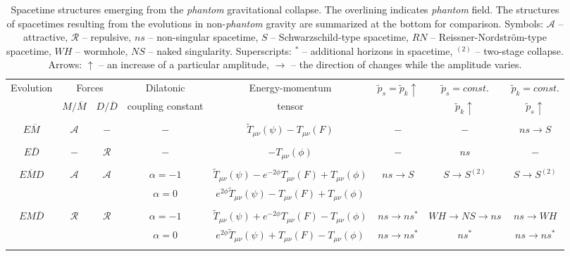 \documentclass[aps,showpacs,nofootinbib,floatfix]{revtex4}
\newcommand{\tpe}{{\tilde p}}
\newcommand{\tT}{\tilde T}
\begin{document}
\begin{table}[t]
\caption{Spacetime structures emerging from the {\it phantom} gravitational collapse. The overlining 
indicates {\it phantom} field. The structures of spacetimes resulting from the evolutions in non-{\it phantom} gravity are summarized at the bottom for comparison. Symbols: $\mathcal{A}$ -- attractive, $\mathcal{R}$ -- repulsive, $ns$ -- non-singular spacetime, $S$ -- Schwarzschild-type spacetime, $RN$ -- Reissner-Nordstr\"{o}m-type spacetime, $WH$ -- wormhole, $NS$ -- naked singularity. Superscripts: $^\ast$ -- additional horizons in spacetime, $^{\left(2\right)}$ -- two-stage collapse. Arrows: $\uparrow$ -- an increase of a particular amplitude, $\rightarrow$ -- the direction of changes while the amplitude varies.}
\begin{ruledtabular}
\begin{tabular}{c|c|c|c|c|c|c|c}
\multirow{2}{*}{Evolution} & \multicolumn{2}{c|}{Forces} & Dilatonic & Energy-momentum & \multirow{2}{*}{$\tpe_s = \tpe_k\uparrow$} & $\tpe_s=const.$ & $\tpe_k=const.$\\ \cline{2-3}
& $M/\overline{M}$ & $D/\overline{D}$ & coupling constant & tensor & & $\tpe_k\uparrow$ & $\tpe_s\uparrow$\\
\hline
& & & & & & &\\

$E\overline{M}$ & $\mathcal{A}$ & $-$ & $-$ & $\tT_{\mu\nu}\left(\psi\right)-T_{\mu\nu}\left(F\right)$ & $-$ & $-$ & $ns\rightarrow S$\\
& & & & & & &\\

$E\overline{D}$ & $-$ & $\mathcal{R}$ & $-$ & $-T_{\mu\nu}\left(\phi\right)$ & $-$ & $ns$ & $-$\\
& & & & & & &\\

\multirow{2}{*}{$E\overline{M}D$} & \multirow{2}{*}{$\mathcal{A}$} & \multirow{2}{*}{$\mathcal{A}$} & $\alpha=-1$ & $\tT_{\mu\nu}\left(\psi\right)-e^{-2\phi}T_{\mu\nu}\left(F\right)+T_{\mu\nu}\left(\phi\right)$ & \multirow{2}{*}{$ns\rightarrow S$} & \multirow{2}{*}{$S\rightarrow S^{\left(2\right)}$} & \multirow{2}{*}{$S\rightarrow S^{\left(2\right)}$}\\
& & & $\alpha=0$ & $e^{2\phi}\tT_{\mu\nu}\left(\psi\right)-T_{\mu\nu}\left(F\right)+T_{\mu\nu}\left(\phi\right)$ & & &\\
& & & & & & &\\

\multirow{2}{*}{$EM\overline{D}$} & \multirow{2}{*}{$\mathcal{R}$} & \multirow{2}{*}{$\mathcal{R}$} & $\alpha=-1$ & $\tT_{\mu\nu}\left(\psi\right)+e^{-2\phi}T_{\mu\nu}\left(F\right)-T_{\mu\nu}\left(\phi\right)$ & $ns\rightarrow ns^\ast$ & $WH\rightarrow NS\rightarrow ns$ & $ns\rightarrow WH$\\
& & & $\alpha=0$ & $e^{2\phi}\tT_{\mu\nu}\left(\psi\right)+T_{\mu\nu}\left(F\right)-T_{\mu\nu}\left(\phi\right)$ & $ns\rightarrow ns^\ast$ & $ns^\ast$ & $ns\rightarrow ns^\ast$\\
& & & & & & &\\


\end{tabular}
\end{ruledtabular}
\end{table}
\end{document}
